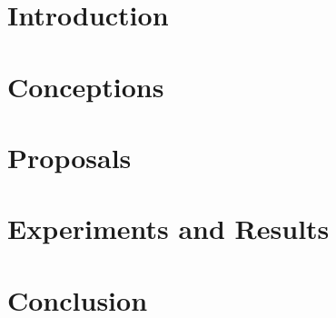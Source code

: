 \documentclass[11pt, english, screen, research-development]{report-rd-info}
\begin{document}
\maketitle



\newpage

\tableofcontents

\chapter{Introduction}



\chapter{Conceptions}


\chapter{Proposals}


\chapter{Experiments and Results}



\chapter{Conclusion}







\appendix
%

%
\end{document}
